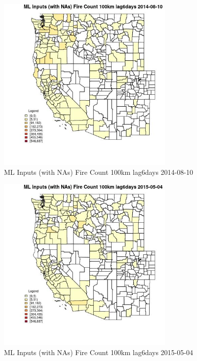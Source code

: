 \begin{figure} 
\centering  
\includegraphics[width=0.77\textwidth]{Code_Outputs/Report_ML_input_PM25_Step4_part_e_de_duplicated_aves_compiled_2019-05-18wNAs_CountyFire_Count_100km_lag6daysMean2014-08-10.jpg} 
\caption{\label{fig:Report_ML_input_PM25_Step4_part_e_de_duplicated_aves_compiled_2019-05-18wNAsCountyFire_Count_100km_lag6daysMean2014-08-10}ML Inputs (with NAs) Fire Count 100km lag6days 2014-08-10} 
\end{figure} 
 

\begin{figure} 
\centering  
\includegraphics[width=0.77\textwidth]{Code_Outputs/Report_ML_input_PM25_Step4_part_e_de_duplicated_aves_compiled_2019-05-18wNAs_CountyFire_Count_100km_lag6daysMean2015-05-04.jpg} 
\caption{\label{fig:Report_ML_input_PM25_Step4_part_e_de_duplicated_aves_compiled_2019-05-18wNAsCountyFire_Count_100km_lag6daysMean2015-05-04}ML Inputs (with NAs) Fire Count 100km lag6days 2015-05-04} 
\end{figure} 
 

